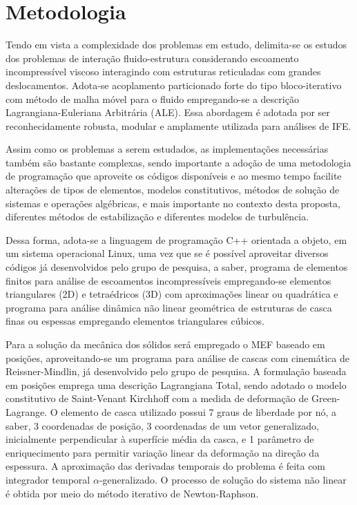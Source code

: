 \chapter{Metodologia} \label{MetodologiaCronograma}

Tendo em vista a complexidade dos problemas em estudo, delimita-se os estudos dos problemas de interação fluido-estrutura considerando escoamento incompressível viscoso interagindo com estruturas reticuladas com grandes deslocamentos. Adota-se acoplamento particionado forte do tipo bloco-iterativo com método de malha móvel para o fluido empregando-se a descrição Lagrangiana-Euleriana Arbitrária (ALE). Essa abordagem é adotada por ser reconhecidamente robusta, modular e amplamente utilizada para análises de IFE.

Assim como os problemas a serem estudados, as implementações necessárias também são bastante complexas, sendo importante a adoção de uma metodologia de programação que aproveite os códigos disponíveis e ao mesmo tempo facilite alterações de tipos de elementos, modelos constitutivos, métodos de solução de sistemas e operações algébricas, e mais importante no contexto desta proposta, diferentes métodos de estabilização e diferentes modelos de turbulência.

Dessa forma, adota-se a linguagem de programação C++ orientada a objeto, em um sistema operacional Linux, uma vez que se é possível aproveitar diversos códigos já desenvolvidos pelo grupo de pesquisa, a saber, programa de elementos finitos para análise de escoamentos incompressíveis empregando-se elementos triangulares (2D) e tetraédricos (3D) com aproximações linear ou quadrática e programa para análise dinâmica não linear geométrica de estruturas de casca finas ou espessas empregando elementos triangulares cúbicos.

Para a solução da mecânica dos sólidos será empregado o MEF baseado em posições, aproveitando-se um programa para análise de cascas com cinemática de Reissner-Mindlin, já desenvolvido pelo grupo de pesquisa. A formulação baseada em posições emprega uma descrição Lagrangiana Total, sendo adotado o modelo constitutivo de Saint-Venant Kirchhoff  com a medida de deformação de Green-Lagrange. O elemento de casca utilizado possui 7 graus de liberdade por nó, a saber, 3 coordenadas de posição, 3 coordenadas de um vetor generalizado, inicialmente perpendicular à superfície média da casca, e 1 parâmetro de enriquecimento para permitir variação linear da deformação na direção da espessura. A aproximação das derivadas temporais do problema é feita com integrador temporal $\alpha$-generalizado. O processo de solução do sistema não linear é obtida por meio do método iterativo de Newton-Raphson.

